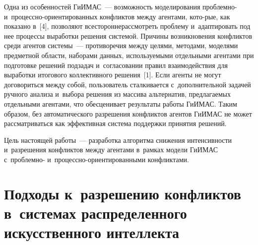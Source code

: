 \begin{multicols}{2}
  Одна из особенностей \mbox{ГиИМАС}~--- возможность моделирования 
проблемно- и~про\-цес\-сно-ори\-ен\-тиро\-ван\-ных конфликтов между 
агентами, кото-\linebreak рые, как показано в~[4], поз\-во\-ля\-ют всесторонне\linebreak рассмотреть 
проблему и~адаптировать под нее процессы выработки решения системой. 
Причины возникновения конфликтов среди агентов сис\-те\-мы~--- 
противоречия между целями, методами, моделями предметной об\-ласти, 
наборами данных, используемыми отдельными агентами при подготовке 
решений подзадач и~согласовании правил взаимодействия для выработки 
итогового коллективного решения~[1]. Если агенты не могут договориться 
между собой, пользователь сталкивается с~дополнительной задачей ручного 
анализа и~выбора решения из массива альтернатив, пред\-ла\-га\-емых отдельными 
агентами, что обесценивает результаты работы \mbox{ГиИМАС}. Таким 
образом, без автоматического разрешения конфликтов 
агентов \mbox{ГиИМАС} не может рас\-смат\-ри\-вать\-ся как эффективная сис\-те\-ма 
поддержки принятия решений. 

Цель настоящей работы~--- разработка 
алгоритма снижения интенсивности и~разрешения 
конфликтов между агентами в~рамках модели \mbox{ГиИМАС} с~проб\-лем\-но-  
и~про\-цес\-сно-ори\-ен\-ти\-ро\-ван\-ны\-ми конфликтами.

  \vspace*{-6pt}
  
\section{Подходы к~разрешению конфликтов в~системах  
распределенного искусственного интеллекта}

  \vspace*{-2pt}


\end{multicols}
